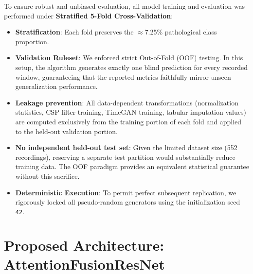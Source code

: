 \documentclass[conference]{IEEEtran}
\begin{document}
To ensure robust and unbiased evaluation, all model training and evaluation
was performed under \textbf{Stratified 5-Fold Cross-Validation}:

\begin{itemize}
    \item \textbf{Stratification}: Each fold preserves the $\approx$7.25\%
    pathological class proportion.
    \item \textbf{Validation Ruleset}: We enforced strict Out-of-Fold (OOF) testing. In this setup, the algorithm generates exactly one blind prediction for every recorded window, guaranteeing that the reported metrics faithfully mirror unseen generalization performance.
    \item \textbf{Leakage prevention}: All data-dependent transformations
    (normalization statistics, CSP filter training, TimeGAN training, tabular
    imputation values) are computed exclusively from the training portion of
    each fold and applied to the held-out validation portion.
    \item \textbf{No independent held-out test set}: Given the limited dataset
    size (552 recordings), reserving a separate test partition would
    substantially reduce training data. The OOF paradigm provides an
    equivalent statistical guarantee without this sacrifice.
    \item \textbf{Deterministic Execution}: To permit perfect subsequent replication, we rigorously locked all pseudo-random generators using the initialization seed \texttt{42}.
\end{itemize}


\section{Proposed Architecture: AttentionFusionResNet}
\end{document}
